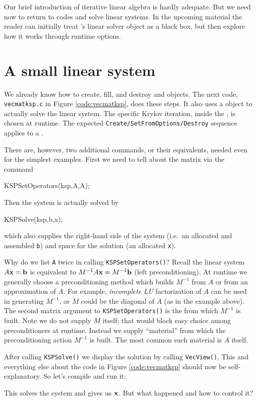 Our brief introduction of iterative linear algebra is hardly adequate.  But we need now to return to \PETSc codes and solve linear systems.  In the upcoming material the reader can initially treat \PETSc's \pKSP linear solver object as a black box, but then explore how it works through runtime options.


\section{A small linear system}

We already know how to create, fill, and destroy \pVec and \pMat objects.  The next code, \texttt{vecmatksp.c} in Figure \ref{code:vecmatksp}, does these steps.  It also uses a \pKSP object to actually solve the linear system.  The specific Krylov iteration, inside the \pKSP, is chosen at runtime.  The expected \texttt{Create/SetFromOptions/Destroy} sequence applies to a \pKSP.

There are, however, two additional commands, or their equivalents, needed even for the simplest examples.  First we need to tell \pKSP about the matrix via the command
\begin{code}
KSPSetOperators(ksp,A,A);
\end{code}
Then the system is actually solved by
\begin{code}
KSPSolve(ksp,b,x);
\end{code}
which also supplies the right-hand side of the system (i.e.~an allocated and assembled \pVec \texttt{b}) and space for the solution (an allocated \pVec \texttt{x}).

Why do we list \texttt{A} twice in calling \texttt{KSPSetOperators()}?  Recall the linear system $A\mathbf{x}=\mathbf{b}$ is equivalent to $M^{-1} A \mathbf{x} = M^{-1} \mathbf{b}$ (left preconditioning).  At runtime we generally choose a preconditioning method which builds $M^{-1}$ from $A$ or from an approximation of $A$.  For example, \emph{incomplete LU} factorization of $A$ can be used in generating $M^{-1}$, or $M$ could be the diagonal of $A$ (as in the example above).  The second matrix argument to \texttt{KSPSetOperators()} is the \pMat from which $M^{-1}$ is built.  Note we do not supply $M$ itself; that would block easy choice among preconditioners at runtime.  Instead we supply ``material'' from which the preconditioning action $M^{-1}$ is built.  The most common such material is $A$ itself.

After calling \texttt{KSPSolve()} we display the solution \pVec by calling \texttt{VecView()}.  This and everything else about the code in Figure \ref{code:vecmatksp} should now be self-explanatory.  So let's compile and run it:
This solves the system and gives us $\mathbf{x}$.  But what happened and how to control it?

